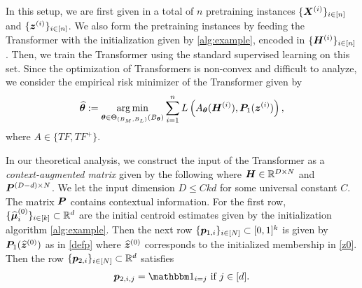 In this setup, we are first given in a total of $n$ pretraining instances $\{\boldsymbol{X}^{(i)}\}_{i\in[n]}$ and $\{\boldsymbol{z}^{(i)}\}_{i\in[n]}$. We also form the pretraining instances by feeding the Transformer with the initialization given by \ref{alg:example}, encoded in $\{\boldsymbol{H}^{(i)}\}_{i\in[n]}$. Then, we train the Transformer using the standard supervised learning on this set. Since the optimization of Transformers is non-convex and difficult to analyze, we consider the empirical risk minimizer of the Transformer given by 
\begin{align}\label{ERM}
    \widehat{\boldsymbol{\theta}} :=\operatorname*{arg\,min}_{\boldsymbol{\theta}\in\Theta_{(B_M,B_L)}(B_{\boldsymbol{\theta}})}\sum_{i=1}^nL\left(A_{\boldsymbol{\theta}}(\boldsymbol{H}^{(i)}),\boldsymbol{P}_1(\boldsymbol{z}^{(i)})\right),
\end{align}
where $A\in\{TF,TF^+\}$.

In our theoretical analysis, we construct the input of the Transformer as a \emph{context-augmented matrix} given by the following
where $\boldsymbol{H}\in\mathbb{R}^{D\times N}$ and $\boldsymbol{P}^{(D-d)\times N}$. We let the input dimension $D\leq Ckd$ for some universal constant $C$.
The matrix $\boldsymbol{P}$ contains contextual information. For the first row, $\{\widehat{\boldsymbol{\mu}}_i^{(0)}\}_{i\in[k]}\subset\mathbb{R}^{d}$ are the initial centroid estimates given by the initialization algorithm \ref{alg:example}. Then the next row $\{\boldsymbol{p}_{1,i}\}_{i\in[N]}\subset[0,1]^{k}$ is given by $\boldsymbol{P}_1(\widehat{\boldsymbol{z}}^{(0)})$ as in \eqref{defp} where $\widehat{\boldsymbol{z}}^{(0)}$ corresponds to the initialized membership in \eqref{z0}. Then the row $\{\boldsymbol{p}_{2,i}\}_{i\in[N]}\subset\mathbb{R}^d$ satisfies
\begin{align*}
    \bfa p_{2,i,j}=\mbbm 1_{i=j}\text{ if }j\in[d].
\end{align*}
